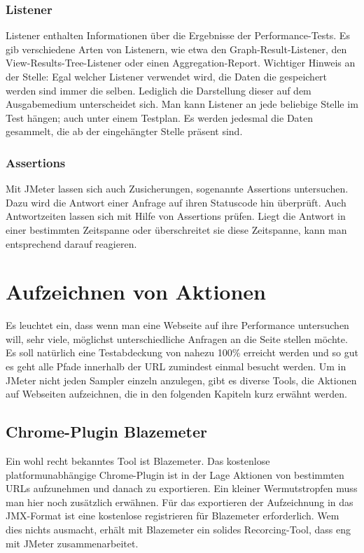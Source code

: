 \documentclass[a4paper,12pt]{article}
\begin{document}
\subsubsection{Listener}
Listener enthalten Informationen über die Ergebnisse der Performance-Tests. Es gib verschiedene Arten von Listenern, wie etwa den Graph-Result-Listener, den View-Results-Tree-Listener oder einen Aggregation-Report. 
Wichtiger Hinweis an der Stelle: Egal welcher Listener verwendet wird, die Daten die gespeichert werden sind immer die selben. Lediglich die Darstellung dieser auf dem Ausgabemedium unterscheidet sich. Man kann Listener an jede beliebige Stelle im Test hängen; auch unter einem Testplan. Es werden jedesmal die Daten gesammelt, die ab der eingehängter Stelle präsent sind.

\subsubsection{Assertions}
Mit JMeter lassen sich auch Zusicherungen, sogenannte Assertions untersuchen. Dazu wird die Antwort einer Anfrage auf ihren Statuscode hin überprüft. Auch Antwortzeiten lassen sich mit Hilfe von Assertions prüfen. Liegt die Antwort in einer bestimmten Zeitspanne oder überschreitet sie diese Zeitspanne, kann man entsprechend darauf reagieren.  

\section{Aufzeichnen von Aktionen}
Es leuchtet ein, dass wenn man eine Webseite auf ihre Performance untersuchen will, sehr viele, möglichst unterschiedliche Anfragen an die Seite stellen möchte. Es soll natürlich eine Testabdeckung von nahezu 100\% erreicht werden und so gut es geht alle Pfade innerhalb der URL zumindest einmal besucht werden. Um in JMeter nicht jeden Sampler einzeln anzulegen, gibt es diverse Tools, die Aktionen auf Webseiten aufzeichnen, die in den folgenden Kapiteln kurz erwähnt werden.  

\subsection{Chrome-Plugin Blazemeter}
Ein wohl recht bekanntes Tool ist Blazemeter. Das kostenlose platformunabhängige Chrome-Plugin ist in der Lage Aktionen von bestimmten URLs aufzunehmen und danach zu exportieren. Ein kleiner Wermutstropfen muss man hier noch zusätzlich erwähnen. Für das exportieren der Aufzeichnung in das JMX-Format ist eine kostenlose registrieren für Blazemeter erforderlich. Wem dies nichts ausmacht, erhält mit Blazemeter ein solides Recorcing-Tool, dass eng mit JMeter zusammenarbeitet. 
\end{document}
